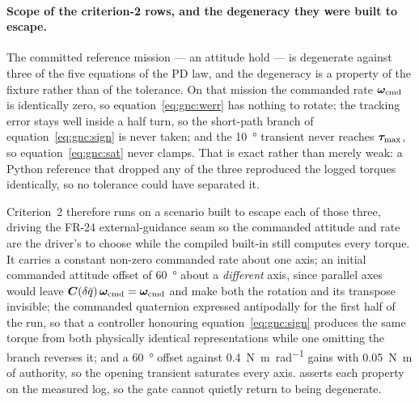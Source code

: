\paragraph{Scope of the criterion-2 rows, and the degeneracy they were
built to escape.} The committed reference mission --- an attitude hold ---
is degenerate against three of the five equations of the PD law, and the
degeneracy is a property of the fixture rather than of the tolerance. On
that mission the commanded rate $\bm{\omega}_{\mathrm{cmd}}$ is identically
zero, so equation~\eqref{eq:gnc:werr} has nothing to rotate; the tracking
error stays well inside a half turn, so the short-path branch of
equation~\eqref{eq:gnc:sign} is never taken; and the \qty{10}{\degree}
transient never reaches $\bm{\tau}_{\max}$, so equation~\eqref{eq:gnc:sat}
never clamps. That is exact rather than merely weak: a Python reference
that dropped any of the three reproduced the logged torques identically,
so no tolerance could have separated it.

Criterion~2 therefore runs on a scenario built to escape each of those
three, driving the FR-24 external-guidance seam so the commanded attitude
and rate are the driver's to choose while the compiled built-in still
computes every torque. It carries a constant non-zero commanded rate about
one axis; an initial commanded attitude offset of \qty{60}{\degree} about a
\emph{different} axis, since parallel axes would leave
$\bm{C}(\delta\bar{q})\,\bm{\omega}_{\mathrm{cmd}} =
\bm{\omega}_{\mathrm{cmd}}$ and make both the rotation and its transpose
invisible; the commanded quaternion expressed antipodally for the first
half of the run, so that a controller honouring
equation~\eqref{eq:gnc:sign} produces the same torque from both physically
identical representations while one omitting the branch reverses it; and a
\qty{60}{\degree} offset against \qty{0.4}{\newton\metre\per\radian} gains
with \qty{0.05}{\newton\metre} of authority, so the opening transient
saturates every axis. 
asserts each property on the measured log, so the gate cannot quietly
return to being degenerate.

